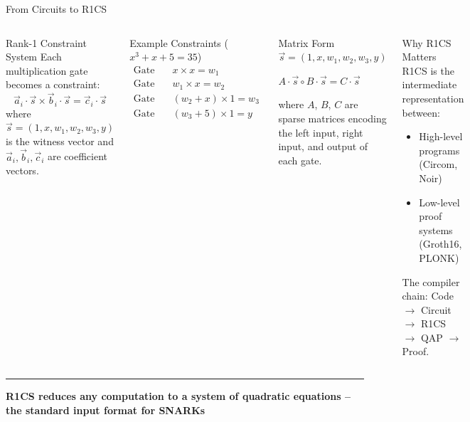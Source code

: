 \documentclass[8pt,aspectratio=169]{beamer}
\newcommand{\bottomnote}[1]{\vfill\vspace{-2mm}\textcolor{mllavender2}{\rule{\textwidth}{0.4pt}}\vspace{1mm}\footnotesize\textbf{#1}}
\begin{document}
\begin{frame}{From Circuits to R1CS}
\begin{columns}[T]
\begin{block}{Rank-1 Constraint System}
\footnotesize
Each multiplication gate becomes a constraint:
\[
\vec{a}_i \cdot \vec{s} \times \vec{b}_i \cdot \vec{s} = \vec{c}_i \cdot \vec{s}
\]
where $\vec{s} = (1, x, w_1, w_2, w_3, y)$ is the witness vector and $\vec{a}_i, \vec{b}_i, \vec{c}_i$ are coefficient vectors.
\end{block}
\vspace{1mm}
\begin{exampleblock}{\footnotesize Example Constraints ($x^3 + x + 5 = 35$)}
\footnotesize
\begin{align*}
\text{Gate 1:}\quad & x \times x = w_1 \\
\text{Gate 2:}\quad & w_1 \times x = w_2 \\
\text{Gate 3:}\quad & (w_2 + x) \times 1 = w_3 \\
\text{Gate 4:}\quad & (w_3 + 5) \times 1 = y
\end{align*}
\end{exampleblock}

\begin{block}{Matrix Form}
\footnotesize
$\vec{s} = (1, x, w_1, w_2, w_3, y)$

\vspace{2mm}
$A \cdot \vec{s} \circ B \cdot \vec{s} = C \cdot \vec{s}$

\vspace{2mm}
where $A$, $B$, $C$ are sparse matrices encoding the left input, right input, and output of each gate.
\end{block}
\vspace{2mm}
\begin{alertblock}{\footnotesize Why R1CS Matters}
\footnotesize
R1CS is the intermediate representation between:
\begin{itemize}
  \item High-level programs (Circom, Noir)
  \item Low-level proof systems (Groth16, PLONK)
\end{itemize}
The compiler chain: Code $\rightarrow$ Circuit $\rightarrow$ R1CS $\rightarrow$ QAP $\rightarrow$ Proof.
\end{alertblock}
\end{columns}
\bottomnote{R1CS reduces any computation to a system of quadratic equations -- the standard input format for SNARKs}
\end{frame}
\end{document}
